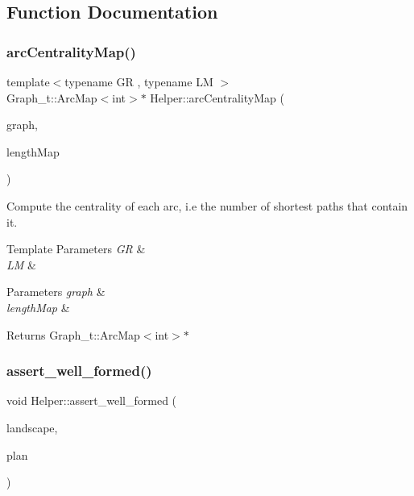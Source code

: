 \subsection{Function Documentation}
\mbox{\label{namespace_helper_a41dff70c57f7082754959faf43d693a4}} 
\subsubsection{\texorpdfstring{arc\+Centrality\+Map()}{arcCentralityMap()}}
{\footnotesize\ttfamily template$<$typename GR , typename LM $>$ \\
Graph\+\_\+t\+::\+Arc\+Map$<$int$>$$\ast$ Helper\+::arc\+Centrality\+Map (\begin{DoxyParamCaption}\item[{const GR \&}]{graph,  }\item[{const LM \&}]{length\+Map }\end{DoxyParamCaption})}



Compute the centrality of each arc, i.\+e the number of shortest paths that contain it. 


\begin{DoxyTemplParams}{Template Parameters}
{\em GR} & \\
\hline
{\em LM} & \\
\hline
\end{DoxyTemplParams}

\begin{DoxyParams}{Parameters}
{\em graph} & \\
\hline
{\em length\+Map} & \\
\hline
\end{DoxyParams}
\begin{DoxyReturn}{Returns}
Graph\+\_\+t\+::\+Arc\+Map$<$int$>$$\ast$ 
\end{DoxyReturn}
\mbox{\label{namespace_helper_a96cce3e519db1c92a36ccb954ebfb855}} 
\subsubsection{\texorpdfstring{assert\+\_\+well\+\_\+formed()}{assert\_well\_formed()}}
{\footnotesize\ttfamily void Helper\+::assert\+\_\+well\+\_\+formed (\begin{DoxyParamCaption}\item[{const \hyperlink{class_landscape}{Landscape} \&}]{landscape,  }\item[{const \hyperlink{class_restoration_plan}{Restoration\+Plan} \&}]{plan }\end{DoxyParamCaption})}

